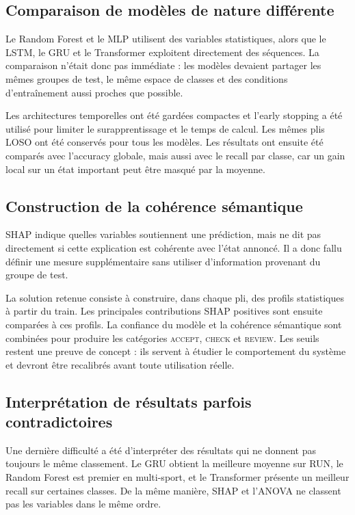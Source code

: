 \documentclass[12pt,a4paper]{article}
\begin{document}
\subsection{Comparaison de modèles de nature différente}

Le Random Forest et le MLP utilisent des variables statistiques, alors que le
LSTM, le GRU et le Transformer exploitent directement des séquences. La
comparaison n'était donc pas immédiate : les modèles devaient partager les
mêmes groupes de test, le même espace de classes et des conditions
d'entraînement aussi proches que possible.

Les architectures temporelles ont été gardées compactes et l'early stopping a
été utilisé pour limiter le surapprentissage et le temps de calcul. Les mêmes
plis LOSO ont été conservés pour tous les modèles. Les résultats ont ensuite
été comparés avec l'accuracy globale, mais aussi avec le recall par classe,
car un gain local sur un état important peut être masqué par la moyenne.

\subsection{Construction de la cohérence sémantique}

SHAP indique quelles variables soutiennent une prédiction, mais ne dit pas
directement si cette explication est cohérente avec l'état annoncé. Il a donc
fallu définir une mesure supplémentaire sans utiliser d'information provenant
du groupe de test.

La solution retenue consiste à construire, dans chaque pli, des profils
statistiques à partir du train. Les principales contributions SHAP positives
sont ensuite comparées à ces profils. La confiance du modèle et la cohérence
sémantique sont combinées pour produire les catégories \textsc{accept},
\textsc{check} et \textsc{review}. Les seuils restent une preuve de concept :
ils servent à étudier le comportement du système et devront être recalibrés
avant toute utilisation réelle.

\subsection{Interprétation de résultats parfois contradictoires}

Une dernière difficulté a été d'interpréter des résultats qui ne donnent pas
toujours le même classement. Le GRU obtient la meilleure moyenne sur RUN, le
Random Forest est premier en multi-sport, et le Transformer présente un
meilleur recall sur certaines classes. De la même manière, SHAP et l'ANOVA ne
classent pas les variables dans le même ordre.
\end{document}
